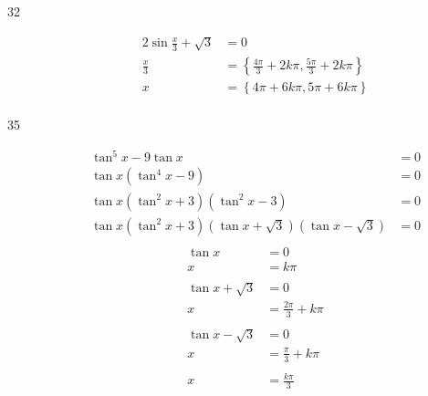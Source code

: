 \documentclass{exam}
\begin{document}
\begin{description}
      \item[32] 
        \begin{align*}
          2 \sin \frac{x}{3} + \sqrt{3} & = 0 \\
          \frac{x}{3}                   & = \left\{ \frac{4 \pi}{3} + 2k \pi, \frac{5 \pi}{3} + 2k \pi \right\} \\
          x                             & = \boxed{ \left\{ 4 \pi + 6k \pi, 5 \pi + 6k \pi \right\} } \\
        \end{align*}

      \item[35] 
        \begin{align*}
          \tan^5 x - 9 \tan x                                            & = 0 \\
          \tan x \left( \tan^4 x - 9 \right)                             & = 0 \\
          \tan x \left( \tan^2 x + 3 \right) \left( \tan^2 x - 3 \right) & = 0 \\
          \tan x \left( \tan^2 x + 3 \right) (\tan x + \sqrt{3}) (\tan x - \sqrt{3}) & = 0 \\
        \end{align*}
        \begin{align*}
          \tan x & = 0 \\
          x      & = k \pi \\
          \\
          \tan x + \sqrt{3} & = 0 \\
          x                 & = \frac{2 \pi}{3} + k \pi \\
          \\
          \tan x - \sqrt{3} & = 0 \\
          x                 & = \frac{\pi}{3} + k \pi \\
          \\
          x & = \boxed{ \frac{k \pi}{3} } \\
        \end{align*}


\end{description}
\end{document}
